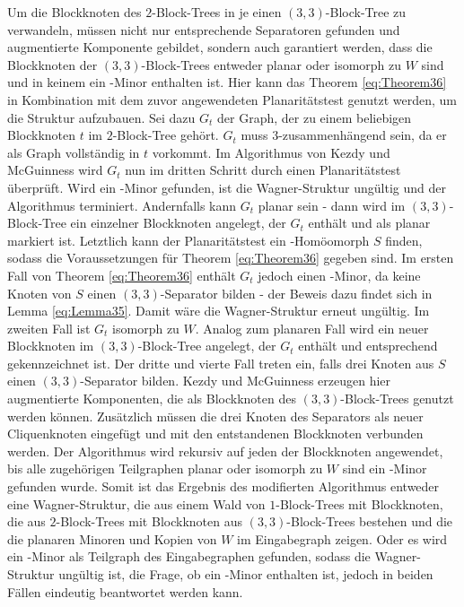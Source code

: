 Um die Blockknoten des $2$-Block-Trees in je einen $(3, 3)$-Block-Tree zu verwandeln, müssen nicht nur entsprechende Separatoren gefunden und augmentierte Komponente gebildet, sondern auch garantiert werden, dass die Blockknoten der $(3, 3)$-Block-Trees entweder planar oder isomorph zu $W$ sind und in keinem ein \kf-Minor enthalten ist.
Hier kann das Theorem \ref{eq:Theorem36} in Kombination mit dem zuvor angewendeten Planaritätstest genutzt werden, um die Struktur aufzubauen.
Sei dazu $G_t$ der Graph, der zu einem beliebigen Blockknoten $t$ im $2$-Block-Tree gehört.
$G_t$ muss $3$-zusammenhängend sein, da er als Graph vollständig in $t$ vorkommt.
Im Algorithmus von Kezdy und McGuinness wird $G_t$ nun im dritten Schritt durch einen Planaritätstest überprüft.
Wird ein \kf-Minor gefunden, ist die Wagner-Struktur ungültig und der Algorithmus terminiert.
Andernfalls kann $G_t$ planar sein - dann wird im $(3, 3)$-Block-Tree ein einzelner Blockknoten angelegt, der $G_t$ enthält und als planar markiert ist.
Letztlich kann der Planaritätstest ein \kdd-Homöomorph $S$ finden, sodass die Voraussetzungen für Theorem \ref{eq:Theorem36} gegeben sind.
Im ersten Fall von Theorem \ref{eq:Theorem36} enthält $G_t$ jedoch einen \kf-Minor, da keine Knoten von $S$ einen $(3, 3)$-Separator bilden - der Beweis dazu findet sich in Lemma \ref{eq:Lemma35}.
Damit wäre die Wagner-Struktur erneut ungültig.
Im zweiten Fall ist $G_t$ isomorph zu $W$.
Analog zum planaren Fall wird ein neuer Blockknoten im $(3, 3)$-Block-Tree angelegt, der $G_t$ enthält und entsprechend gekennzeichnet ist.
Der dritte und vierte Fall treten ein, falls drei Knoten aus $S$ einen $(3, 3)$-Separator bilden.
Kezdy und McGuinness erzeugen hier augmentierte Komponenten, die als Blockknoten des $(3, 3)$-Block-Trees genutzt werden können.
Zusätzlich müssen die drei Knoten des Separators als neuer Cliquenknoten eingefügt und mit den entstandenen Blockknoten verbunden werden.
Der Algorithmus wird rekursiv auf jeden der Blockknoten angewendet, bis alle zugehörigen Teilgraphen planar oder isomorph zu $W$ sind \bzw ein \kf-Minor gefunden wurde.
Somit ist das Ergebnis des modifierten Algorithmus entweder eine Wagner-Struktur, die aus einem Wald von $1$-Block-Trees mit Blockknoten, die aus $2$-Block-Trees mit Blockknoten aus $(3, 3)$-Block-Trees bestehen und die die planaren Minoren und Kopien von $W$ im Eingabegraph zeigen.
Oder es wird ein \kf-Minor als Teilgraph des Eingabegraphen gefunden, sodass die Wagner-Struktur ungültig ist, die Frage, ob ein \kf-Minor enthalten ist, jedoch in beiden Fällen eindeutig beantwortet werden kann.

